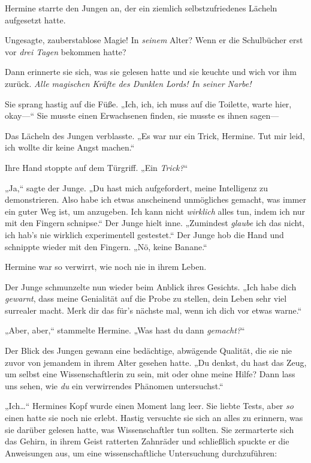 {Hermine starrte den Jungen an, der ein ziemlich selbstzufriedenes Lächeln aufgesetzt hatte.

Ungesagte, zauberstablose Magie! In \emph{seinem} Alter? Wenn er die Schulbücher erst vor \emph{drei Tagen} bekommen hatte?

Dann erinnerte sie sich, was sie gelesen hatte und sie keuchte und wich vor ihm zurück. \emph{Alle magischen Kräfte des Dunklen Lords! In seiner Narbe!}

Sie sprang hastig auf die Füße. „Ich, ich, ich muss auf die Toilette, warte hier, okay—“ Sie musste einen Erwachsenen finden, sie musste es ihnen sagen—

Das Lächeln des Jungen verblasste. „Es war nur ein Trick, Hermine. Tut mir leid, ich wollte dir keine Angst machen.“

Ihre Hand stoppte auf dem Türgriff. „Ein \emph{Trick?}“

„Ja,“ sagte der Junge. „Du hast mich aufgefordert, meine Intelligenz zu demonstrieren. Also habe ich etwas anscheinend unmögliches gemacht, was immer ein guter Weg ist, um anzugeben. Ich kann nicht \emph{wirklich} alles tun, indem ich nur mit den Fingern schnipse.“ Der Junge hielt inne. „Zumindest \emph{glaube} ich das nicht, ich hab's nie wirklich experimentell gestestet.“ Der Junge hob die Hand und schnippte wieder mit den Fingern. „Nö, keine Banane.“

Hermine war so verwirrt, wie noch nie in ihrem Leben.

Der Junge schmunzelte nun wieder beim Anblick ihres Gesichts. „Ich habe dich \emph{gewarnt}, dass meine Genialität auf die Probe zu stellen, dein Leben sehr viel surrealer macht. Merk dir das für's nächste mal, wenn ich dich vor etwas warne.“

„Aber, aber,“ stammelte Hermine. „Was hast du dann \emph{gemacht?}“

Der Blick des Jungen gewann eine bedächtige, abwägende Qualität, die sie nie zuvor von jemandem in ihrem Alter gesehen hatte. „Du denkst, du hast das Zeug, um selbst eine Wissenschaftlerin zu sein, mit oder ohne meine Hilfe? Dann lass uns sehen, wie \emph{du} ein verwirrendes Phänomen untersuchst.“

„Ich…“ Hermines Kopf wurde einen Moment lang leer. Sie liebte Tests, aber \emph{so} einen hatte sie noch nie erlebt. Hastig versuchte sie sich an alles zu erinnern, was sie darüber gelesen hatte, was Wissenschaftler tun sollten. Sie zermarterte sich das Gehirn, in ihrem Geist ratterten Zahnräder und schließlich spuckte er die Anweisungen aus, um eine wissenschaftliche Untersuchung durchzuführen:

}
